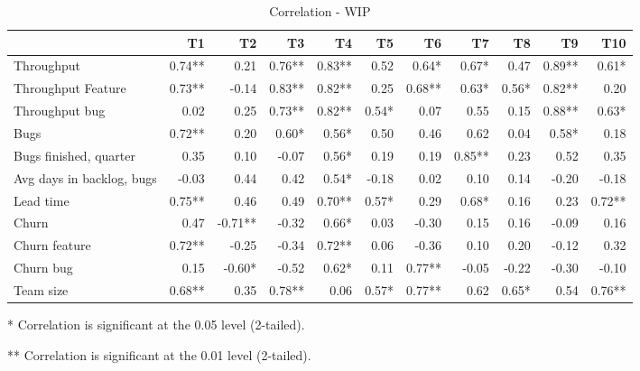 \documentclass[UKenglish]{ifimaster}  %
\begin{document}
\begin{table}[!htbp]
 \begin{adjustwidth}{-2.5cm}{}
 \centering
 \begin{tabular}{|l|r|r|r|r|r|r|r|r|r|r|}
\hline
 & \bf{T1} & \bf{T2} & \bf{T3} & \bf{T4} & \bf{T5} & \bf{T6} & \bf{T7} & \bf{T8} & \bf{T9} & \bf{T10}\\ \hline
 Throughput  & 0.74** & 0.21 & 0.76** & 0.83** & 0.52 & 0.64* & 0.67* & 0.47 & 0.89** & 0.61* \\ \hline
 Throughput Feature  & 0.73** & -0.14 & 0.83** & 0.82** & 0.25 & 0.68** & 0.63* & 0.56* & 0.82** & 0.20 \\ \hline
 Throughput bug  & 0.02 & 0.25 & 0.73** & 0.82** & 0.54* & 0.07 & 0.55 & 0.15 & 0.88** & 0.63* \\ \hline
 Bugs  & 0.72** & 0.20 & 0.60* & 0.56* & 0.50 & 0.46 & 0.62 & 0.04 & 0.58* & 0.18 \\ \hline
 Bugs finished, quarter  & 0.35 & 0.10 & -0.07 & 0.56* & 0.19 & 0.19 & 0.85** & 0.23 & 0.52 & 0.35 \\ \hline
 Avg days in backlog, bugs  & -0.03 & 0.44 & 0.42 & 0.54* & -0.18 & 0.02 & 0.10 & 0.14 & -0.20 & -0.18 \\ \hline
 Lead time  & 0.75** & 0.46 & 0.49 & 0.70** & 0.57* & 0.29 & 0.68* & 0.16 & 0.23 & 0.72** \\ \hline
 Churn  & 0.47 & -0.71** & -0.32 & 0.66* & 0.03 & -0.30 & 0.15 & 0.16 & -0.09 & 0.16 \\ \hline
 Churn feature  & 0.72** & -0.25 & -0.34 & 0.72** & 0.06 & -0.36 & 0.10 & 0.20 & -0.12 & 0.32 \\ \hline
 Churn bug  & 0.15 & -0.60* & -0.52 & 0.62* & 0.11 & 0.77** & -0.05 & -0.22 & -0.30 & -0.10 \\ \hline
 Team size  & 0.68** & 0.35 & 0.78** & 0.06 & 0.57* & 0.77** & 0.62 & 0.65* & 0.54 & 0.76**
\\ \hline
\end{tabular}
 \caption{Correlation - WIP}
\label{corr:WIP}
 \centerline {* Correlation is significant at the 0.05 level (2-tailed).}
\centerline{** Correlation is significant at the 0.01 level (2-tailed).}
\end{adjustwidth}
\end{table}
\newpage
\end{document}
